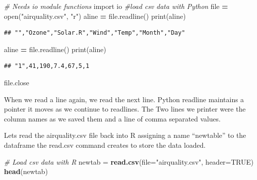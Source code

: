 \documentclass[]{book}
\newenvironment{Shaded}{\begin{snugshade}}{\end{snugshade}}
\newcommand{\KeywordTok}[1]{\textcolor[rgb]{0.13,0.29,0.53}{\textbf{#1}}}
\newcommand{\DataTypeTok}[1]{\textcolor[rgb]{0.13,0.29,0.53}{#1}}
\newcommand{\StringTok}[1]{\textcolor[rgb]{0.31,0.60,0.02}{#1}}
\newcommand{\ImportTok}[1]{#1}
\newcommand{\CommentTok}[1]{\textcolor[rgb]{0.56,0.35,0.01}{\textit{#1}}}
\newcommand{\OtherTok}[1]{\textcolor[rgb]{0.56,0.35,0.01}{#1}}
\newcommand{\OperatorTok}[1]{\textcolor[rgb]{0.81,0.36,0.00}{\textbf{#1}}}
\newcommand{\BuiltInTok}[1]{#1}
\newcommand{\NormalTok}[1]{#1}
\theoremstyle{definition}
\theoremstyle{definition}
\theoremstyle{definition}
\theoremstyle{remark}
\begin{document}
\begin{Shaded}
\begin{Highlighting}[]
\CommentTok{# Needs io module functions}
\ImportTok{import}\NormalTok{ io}
\CommentTok{#load csv data with Python }
\BuiltInTok{file} \OperatorTok{=} \BuiltInTok{open}\NormalTok{(}\StringTok{"airquality.csv"}\NormalTok{, }\StringTok{"r"}\NormalTok{)}
\NormalTok{aline }\OperatorTok{=} \BuiltInTok{file}\NormalTok{.readline()}
\BuiltInTok{print}\NormalTok{(aline)}
\end{Highlighting}
\end{Shaded}

\begin{verbatim}
## "","Ozone","Solar.R","Wind","Temp","Month","Day"
\end{verbatim}

\begin{Shaded}
\begin{Highlighting}[]
\NormalTok{aline }\OperatorTok{=} \BuiltInTok{file}\NormalTok{.readline()}
\BuiltInTok{print}\NormalTok{(aline)}
\end{Highlighting}
\end{Shaded}

\begin{verbatim}
## "1",41,190,7.4,67,5,1
\end{verbatim}

\begin{Shaded}
\begin{Highlighting}[]
\BuiltInTok{file}\NormalTok{.close}
\end{Highlighting}
\end{Shaded}

When we read a line again, we read the next line. Python readline
maintains a pointer it moves as we continue to readlines. The Two lines
we printer were the column names as we saved them and a line of comma
separated values.

Lets read the airquality.csv file back into R assigning a name
``newtable'' to the dataframe the read.csv  command
creates to store the data loaded.

\begin{Shaded}
\begin{Highlighting}[]
\CommentTok{# Load csv data with R}
\NormalTok{newtab =}\StringTok{ }\KeywordTok{read.csv}\NormalTok{(}\DataTypeTok{file=}\StringTok{"airquality.csv"}\NormalTok{, }\DataTypeTok{header=}\OtherTok{TRUE}\NormalTok{)}
\KeywordTok{head}\NormalTok{(newtab)}
\end{Highlighting}
\end{Shaded}
\end{document}
